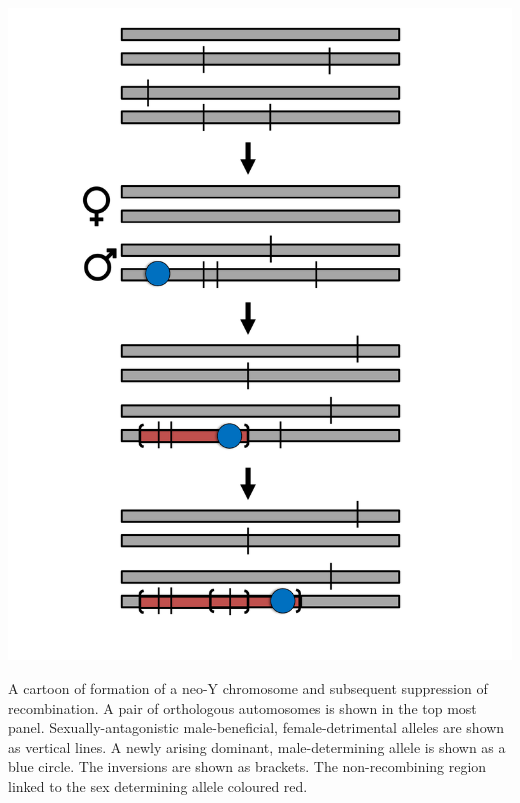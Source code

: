  \begin{marginfigure} %
\begin{center}
\includegraphics[width = \textwidth]{figures/neo_Y_evol.pdf}
\end{center}
\caption{A cartoon of formation of a neo-Y chromosome and subsequent suppression of recombination. A pair of orthologous automosomes is shown in the top most panel.  Sexually-antagonistic male-beneficial, female-detrimental alleles are shown as vertical lines. A newly arising dominant, male-determining allele is shown as a blue circle. The inversions are shown as brackets. The non-recombining region linked to the sex determining allele coloured red.}  \label{fig:neo_Y_evol}
\end{marginfigure}

